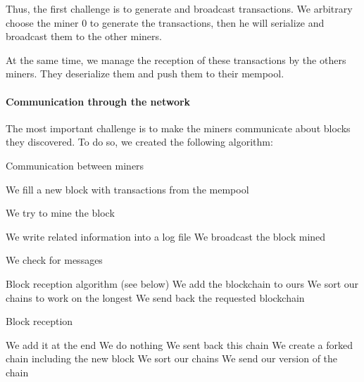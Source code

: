 Thus, the first challenge is to generate and broadcast transactions. We arbitrary choose the miner 0 to generate the transactions, then he will serialize and broadcast them to the other miners.

At the same time, we manage the reception of these transactions by the others miners. They deserialize them and push them to their mempool. \newline

\paragraph{Communication through the network}

The most important challenge is to make the miners communicate about blocks they discovered. To do so, we created the following algorithm:

\clearpage

\begin{algorithm}
  \caption{Communication between miners}
  \begin{algorithmic}

      \STATE We fill a new block with transactions from the mempool

        \STATE We try to mine the block

          \STATE We write related information into a log file
          \STATE We broadcast the block mined
        \ENDIF

        \STATE We check for messages

          \STATE Block reception algorithm (see below)
          \STATE We add the blockchain to ours
          \STATE We sort our chains to work on the longest
          \STATE We send back the requested blockchain
        \ENDIF

      \ENDWHILE
    \ENDWHILE
  \end{algorithmic}
\end{algorithm}

\begin{algorithm}
  \caption{Block reception}

  \begin{algorithmic}
        \STATE We add it at the end
        \STATE We do nothing
      \ELSE
            \STATE We sent back this chain
            \STATE We create a forked chain including the new block
            \STATE We sort our chains
            \STATE We send our version of the chain
          \ENDIF
        \ENDFOR
      \ENDIF
    \ENDFOR

  \end{algorithmic}

\end{algorithm}

